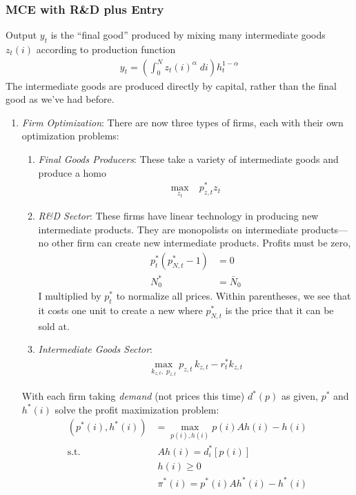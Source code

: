 \documentclass[12pt]{article}
\theoremstyle{plain}
\theoremstyle{definition}
\theoremstyle{remark}
\newcommand{\intzN}{\int_0^N}
\begin{document}
\clearpage
\subsubsection{MCE with R\&D plus Entry}

Output $y_t$ is the ``final good'' produced by mixing many intermediate
goods $z_t(i)$ according to production function
\begin{align*}
  y_t = \left( \intzN z_t(i)^\alpha \; di \right) h_t^{1-\alpha}
\end{align*}
The intermediate goods are produced directly by capital, rather than the
final good as we've had before.
\begin{enumerate}
  \item \emph{Firm Optimization}:
    There are now three types of firms, each with their own optimization
    problems:
    \begin{enumerate}
      \item \emph{Final Goods Producers}:
        These take a variety of intermediate goods and produce a homo
        \begin{align*}
          \max_{z_t} \; & p^*_{z,t} z_t
        \end{align*}

      \item \emph{R\&D Sector}: These firms have linear technology in
        producing new intermediate products. They are monopolists on
        intermediate products---no other firm can create new
        intermediate products. Profits must be zero,
        \begin{align*}
          p_t^* (p_{N,t}^*-1) &= 0 \\
          N_0^* &= \bar{N}_0
        \end{align*}
        I multiplied by $p_t^*$ to normalize all prices. Within
        parentheses, we see that it costs one unit to create a new where
        $p_{N,t}^*$ is the price that it can be sold at.

      \item \emph{Intermediate Goods Sector}:
        \begin{align*}
          \max_{k_{z,t}, \; p_{z,t}}
          p_{z,t} \, k_{z,t}
          - r_t^* k_{z,t}
        \end{align*}

    \end{enumerate}
    With each firm taking \emph{demand}
    (not prices this time) $d^*(p)$ as given, $p^*$ and $h^*(i)$
    solve the profit maximization problem:
    \begin{align*}
      (p^*(i),h^*(i))
      &=
      \max_{p(i),h(i)}
      p(i) Ah(i) - h(i) \\
      \text{s.t.} \;
      & \; Ah(i) = d_i^*[p(i)] \\
      & \; h(i) \geq 0\\
      & \; \pi^*(i) = p^*(i) Ah^*(i) - h^*(i)
    \end{align*}


\end{enumerate}
\end{document}
